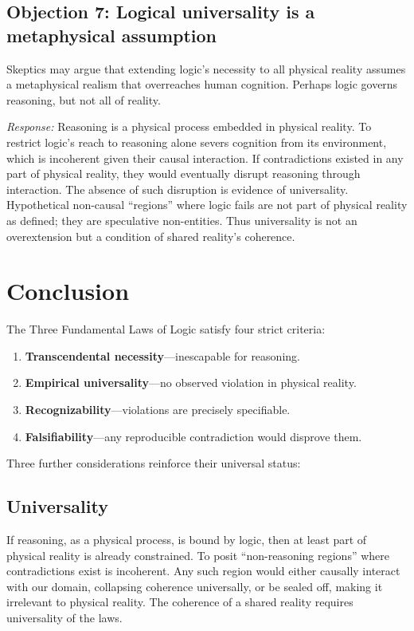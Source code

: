 \documentclass[12pt]{article}
\begin{document}
\subsection*{Objection 7: Logical universality is a metaphysical assumption}
Skeptics may argue that extending logic’s necessity to all physical reality assumes a metaphysical realism that overreaches human cognition. Perhaps logic governs reasoning, but not all of reality.

\emph{Response:} Reasoning is a physical process embedded in physical reality. To restrict logic’s reach to reasoning alone severs cognition from its environment, which is incoherent given their causal interaction. If contradictions existed in any part of physical reality, they would eventually disrupt reasoning through interaction. The absence of such disruption is evidence of universality. Hypothetical non-causal ``regions'' where logic fails are not part of physical reality as defined; they are speculative non-entities. Thus universality is not an overextension but a condition of shared reality’s coherence.

\section{Conclusion}
The Three Fundamental Laws of Logic satisfy four strict criteria:
\begin{enumerate}
    \item \textbf{Transcendental necessity}---inescapable for reasoning.
    \item \textbf{Empirical universality}---no observed violation in physical reality.
    \item \textbf{Recognizability}---violations are precisely specifiable.
    \item \textbf{Falsifiability}---any reproducible contradiction would disprove them.
\end{enumerate}

Three further considerations reinforce their universal status:

\subsection*{Universality}
If reasoning, as a physical process, is bound by logic, then at least part of physical reality is already constrained. To posit ``non-reasoning regions'' where contradictions exist is incoherent. Any such region would either causally interact with our domain, collapsing coherence universally, or be sealed off, making it irrelevant to physical reality. The coherence of a shared reality requires universality of the laws.
\end{document}
